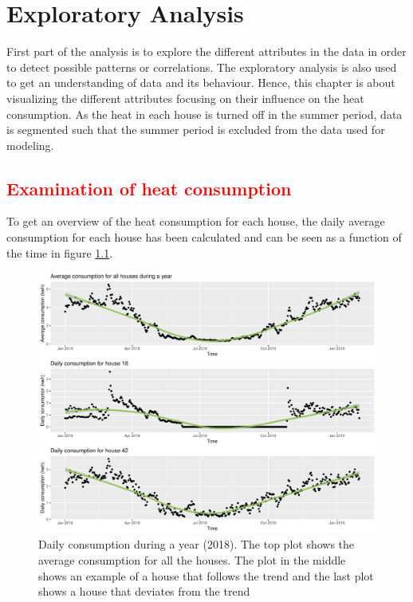 \chapter{Exploratory Analysis}
First part of the analysis is to explore the different attributes in the data in order to detect possible patterns or correlations. The exploratory analysis is also used to get an understanding of data and its behaviour. Hence, this chapter is about visualizing the different attributes focusing on their influence on the heat consumption. As the heat in each house is turned off in the summer period, data is segmented such that the summer period is excluded from the data used for modeling. \\

\section{\textcolor{red}{Examination of heat consumption}}
\noindent To get an overview of the heat consumption for each house, the daily average consumption for each house has been calculated and can be seen as a function of the time in figure \ref{fig: daily_cons}. 

\begin{figure}
    \centering
    \includegraphics[width=.8\textwidth]{../../../figures/avg_daily.pdf}
    \caption{Daily consumption during a year (2018). The top plot shows the average consumption for all the houses. The plot in the middle shows an example of a house that follows the trend and the last plot shows a house that deviates from the trend}
    \label{fig: daily_cons}
\end{figure}

